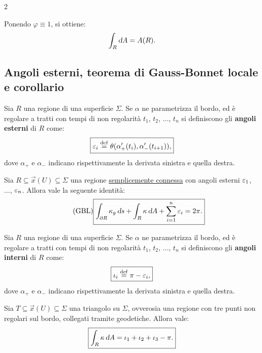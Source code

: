 \begin{multicols*}{2}
    \begin{remark}
        Ponendo $\varphi \equiv 1$, si ottiene:
        \[
            \int_R \dA = A(R).
        \]
    \end{remark}

    \subsection{Angoli esterni, teorema di Gauss-Bonnet locale e corollario}

    \begin{definition}
        Sia $R$ una regione di una superficie $\Sigma$. Se $\alpha$ ne
        parametrizza il bordo, ed è regolare a tratti con tempi
        di non regolarità $t_1$, $t_2$, ..., $t_n$ si definiscono
        gli \textbf{angoli esterni} di $R$ come:
        \[
            \boxed{\varepsilon_i \overset{\mathrm{def}}{=} \theta(\alpha_+'(t_i), \alpha_-'(t_{i+1})),}
        \]
        dove $\alpha_+$ e $\alpha_-$ indicano rispettivamente la
        derivata sinistra e quella destra.
    \end{definition}

    \begin{theorem} \label{thm:GBL}
        Sia $R \subseteq \vec{x}(U) \subseteq \Sigma$ una regione
        \underline{semplicemente connessa} con angoli esterni
        $\varepsilon_1$, ..., $\varepsilon_n$. Allora vale la seguente identità:
        \begin{equation*} \tag{GBL} \label{eq:GBL}
            \boxed{\int_{\partial R} \kappa_g \ds + \int_R \kappa \dA + \sum_{i=1}^n \eps_i = 2\pi.}
        \end{equation*}
    \end{theorem}

    \begin{definition}
        Sia $R$ una regione di una superficie $\Sigma$. Se $\alpha$ ne
        parametrizza il bordo, ed è regolare a tratti con tempi
        di non regolarità $t_1$, $t_2$, ..., $t_n$ si definiscono
        gli \textbf{angoli interni} di $R$ come:
        \[
            \boxed{\iota_i \overset{\mathrm{def}}{=} \pi - \varepsilon_i,}
        \]
        dove $\alpha_+$ e $\alpha_-$ indicano rispettivamente la
        derivata sinistra e quella destra.
    \end{definition}

    \begin{corollary} \label{cor:angoli_triangolo}
        Sia $T \subseteq \vec{x}(U) \subseteq \Sigma$ una triangolo
        su $\Sigma$, ovverosia una regione con tre punti non regolari sul
        bordo, collegati tramite geodetiche. Allora vale:
        \[
            \boxed{\int_R \kappa \dA = \iota_1 + \iota_2 + \iota_3 - \pi.}
        \]
    \end{corollary}


\end{multicols*}
